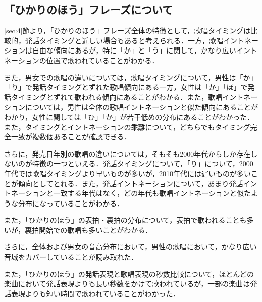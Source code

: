 \subsection{「ひかりのほう」フレーズについて}
\ref{sec:4}節より，「ひかりのほう」フレーズ全体の特徴として，歌唱タイミングは比較的，発話タイミングと近しい場合もあると考えられる．一方，歌唱イントネーションは自由な傾向にあるが，特に「か」と「う」に関して，かなり広いイントネーションの位置で歌われていることがわかる．\par
また，男女での歌唱の違いについては，歌唱タイミングについて，男性は「か」「り」で発話タイミングとずれた歌唱傾向にある一方，女性は「か」「ほ」で発話タイミングとずれて歌われる傾向にあることがわかる．また，歌唱イントネーションについては，男性は全体の歌唱イントネーションと似た傾向にあることがわかり，女性に関しては「ひ」「か」が若干低めの分布にあることがわかった．また，タイミングとイントネーションの乖離について，どちらでもタイミング完全一致が複数個あることが確認できる．\par
さらに，発売日年別の歌唱の違いについては，そもそも2000年代からしか存在しないのが特徴の一つといえる．発話タイミングについて，「り」について，2000年代では歌唱タイミングより早いものが多いが，2010年代には遅いものが多いことが傾向としてとれる．また，発話イントネーションについて，あまり発話イントネーションと一致する年代はなく，どの年代も歌唱イントネーションと似たような分布になっていることがわかる．\par
また，「ひかりのほう」の表拍・裏拍の分布について，表拍で歌われることも多いが，裏拍開始での歌唱も多いことがわかる．\par
さらに，全体および男女の音高分布において，男性の歌唱において，かなり広い音域をカバーしていることが読み取れた．\par
また，「ひかりのほう」の発話表現と歌唱表現の秒数比較について，ほとんどの楽曲において発話表現よりも長い秒数をかけて歌われているが，一部の楽曲は発話表現よりも短い時間で歌われていることがわかった．




